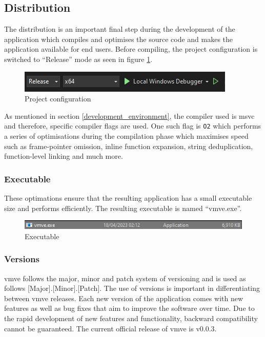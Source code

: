 \documentclass[11pt]{article}
\begin{document}
\subsection{Distribution}
The distribution is an important final step during the development of the
application which compiles and optimises the source code and makes the
application available for end users. Before compiling, the project configuration
is switched to ``Release'' mode as seen in figure \ref{fig:project_configuration}.

\begin{figure}[H]
  \centering
  \includegraphics[width=\textwidth]{images/project_configuration.png}
  \caption{Project configuration}
  \label{fig:project_configuration}
\end{figure}

As mentioned in section \ref{development_environment}, the compiler used is
\gls*{msvc} and therefore, specific compiler flags are used. One such flag is
\lstinline{O2} which performs a series of optimisations during the compilation
phase which maximises speed such as frame-pointer omission, inline function
expansion, string deduplication, function-level linking and much more.

\subsubsection{Executable}
These optimations ensure that the resulting application has a small executable size
and performs efficiently. The resulting executable is named ``vmve.exe''.

\begin{figure}[H]
  \centering
  \includegraphics[width=\textwidth]{images/executable.png}
  \caption{Executable}
  \label{fig:executable}
\end{figure}

\subsubsection{Versions}
\gls*{vmve} follows the major, minor and patch system of versioning and is used
as follows [Major].[Minor].[Patch]. The use of versions is important in
differentiating between \gls*{vmve} releases. Each new version of the application
comes with new features as well as bug fixes that aim to improve the software
over time. Due to the rapid development of new features and functionality,
backward compatibility cannot be guaranteed. The current official release of
\gls*{vmve} is v0.0.3.
\end{document}
